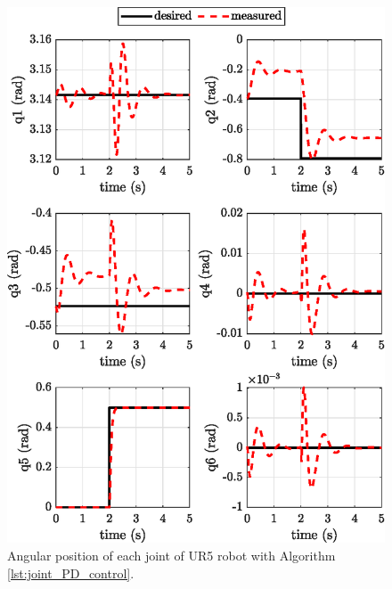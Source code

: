\begin{figure}
    \centering
    \includegraphics{images/act_1.3/joint_position.eps}
    \caption{Angular position of each joint of UR5 robot with Algorithm \ref{lst:joint_PD_control}.}
    \label{fig:act_1.3_joint_position}
\end{figure}

